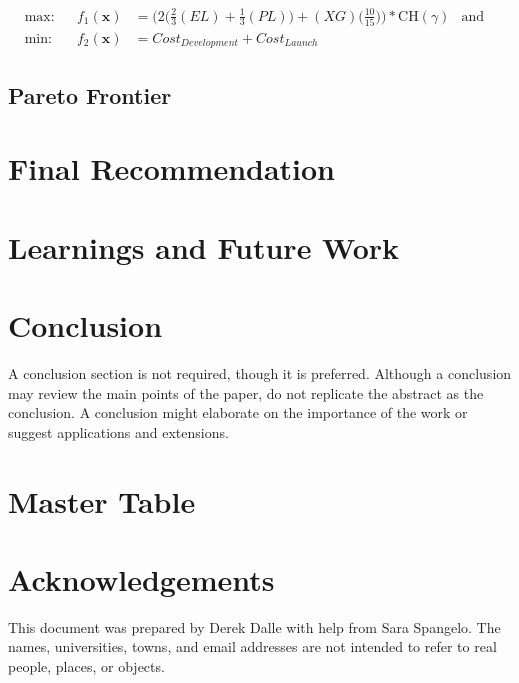 \documentclass[]{aiaa-pretty}
\begin{document}
\begin{align*}
\label{eqn:mulitobj}
\mbox{max:}& &f_1(\boldsymbol{x})&=\bigg(2\bigg(\frac{2}{3}(EL)+\frac{1}{3}(PL)\bigg)+ (XG)\bigg(\frac{10}{15}\bigg)\bigg)*\text{CH}(\gamma)& \text{and}& \\
\mbox{min:}& &f_2(\boldsymbol{x})&=Cost_{Development}+Cost_{Launch} & &
\end{align*}

\subsection{Pareto Frontier}


\section{Final Recommendation}


\section{Learnings and Future Work} 

\section{Conclusion}
A conclusion section is not required, though it is preferred. Although a conclusion may review the main points of the paper, do not replicate the abstract as the conclusion. A conclusion might elaborate on the importance of the work or suggest applications and extensions. 

\appendix
\section{Master Table}
\label{app:mastertab}


\section*{Acknowledgements}
This document was prepared by Derek Dalle with help from Sara Spangelo.  The names, universities, towns, and email addresses are not intended to refer to real people, places, or objects.



\end{document}
